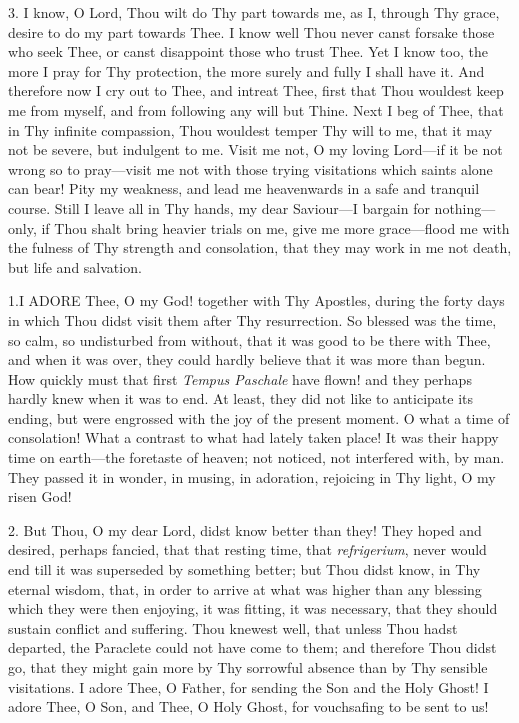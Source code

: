 3. I know, O Lord, Thou wilt do
Thy part towards me, as I, through Thy grace, desire to do my part
towards Thee. I know well Thou never canst forsake those who seek Thee,
or canst disappoint those who trust Thee. Yet I know too, the more I
pray for Thy protection, the more surely and fully I shall have it. And
therefore now I cry out to Thee, and intreat Thee, first that Thou
wouldest keep me from myself, and from following any will but Thine.
Next I beg of Thee, that in Thy infinite compassion, Thou wouldest
temper Thy will to me, that it may not be severe, but indulgent to me.
Visit me not, O my loving Lord—if it be not wrong so to pray—visit
me not with those trying visitations which saints alone can bear! Pity
my weakness, and lead me heavenwards in a safe and tranquil course.
Still I leave all in Thy hands, my dear Saviour—I bargain for
nothing—only, if Thou shalt bring heavier trials on me, give me more
grace—flood me with the fulness of Thy strength and consolation, that
they may work in me not death, but life and salvation.


1.\emph{}I ADORE
Thee, O my God! together with Thy Apostles, during the forty days in
which Thou didst visit them after Thy resurrection. So blessed was the
time, so calm, so undisturbed from without, that it was good to be there
with Thee, and when it was over, they could hardly believe that it was
more than begun. How quickly must that first \emph{Tempus Paschale}
have flown! and they perhaps hardly knew when it was to end. At least,
they did not like to anticipate its ending, but were engrossed with the
joy of the present moment. O what a time of consolation! What a contrast
to what had lately taken place! It was their happy time on earth—the
foretaste of heaven; not noticed, not interfered with, by man. They
passed it in wonder, in musing, in adoration, rejoicing in Thy light, O
my risen God!

2. But Thou, O my dear Lord,
didst know better than they! They hoped and desired, perhaps fancied,
that that resting time, that \emph{refrigerium}, never would end till it
was superseded by something better; but Thou didst know, in Thy eternal
wisdom, that, in order to arrive at what was higher than any blessing
which they were then enjoying, it was fitting, it was necessary, that
they should sustain conflict and suffering. Thou knewest well, that
unless Thou hadst departed, the Paraclete could not have come to them;
and therefore Thou didst go, that they might gain more by Thy sorrowful
absence than by Thy sensible visitations. I adore Thee, O Father, for
sending the Son and the Holy Ghost! I adore Thee, O Son, and Thee, O
Holy Ghost, for vouchsafing to be sent to us!


